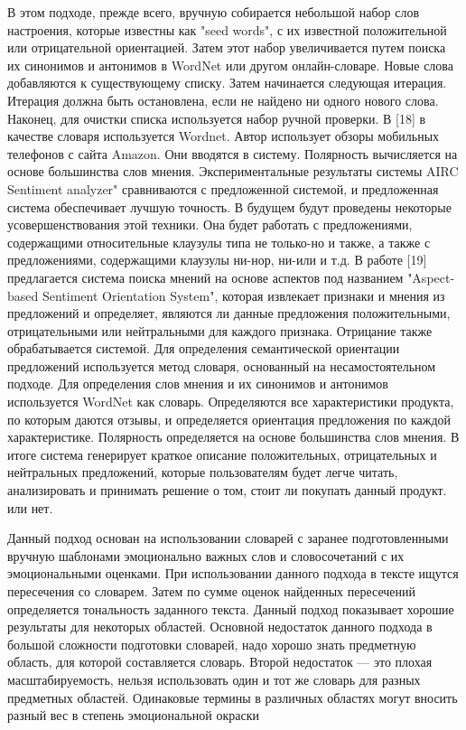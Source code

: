 В этом подходе, прежде всего, вручную собирается небольшой набор слов
настроения, которые известны как "seed words", с их известной положительной или
отрицательной ориентацией. Затем этот набор увеличивается путем поиска их
синонимов и антонимов в WordNet или другом онлайн-словаре. Новые слова
добавляются к существующему списку. Затем начинается следующая итерация.
Итерация должна быть остановлена, если не найдено ни одного нового слова.
Наконец, для очистки списка используется набор ручной проверки. В [18] в
качестве словаря используется Wordnet. Автор использует обзоры мобильных
телефонов с сайта Amazon. Они вводятся в систему. Полярность вычисляется на
основе большинства слов мнения. Экспериментальные результаты системы AIRC
Sentiment analyzer" сравниваются с предложенной системой, и предложенная система
обеспечивает лучшую точность. В будущем будут проведены некоторые
усовершенствования этой техники. Она будет работать с предложениями, содержащими
относительные клаузулы типа не только-но и также, а также с предложениями,
содержащими клаузулы ни-нор, ни-или и т.д.  В работе [19] предлагается система
поиска мнений на основе аспектов под названием "Aspect-based Sentiment
Orientation System", которая извлекает признаки и мнения из предложений и
определяет, являются ли данные предложения положительными, отрицательными или
нейтральными для каждого признака. Отрицание также обрабатывается системой. Для
определения семантической ориентации предложений используется метод словаря,
основанный на несамостоятельном подходе. Для определения слов мнения и их
синонимов и антонимов используется WordNet как словарь. Определяются все
характеристики продукта, по которым даются отзывы, и определяется ориентация
предложения по каждой характеристике. Полярность определяется на основе
большинства слов мнения. В итоге система генерирует краткое описание
положительных, отрицательных и нейтральных предложений, которые пользователям
будет легче читать, анализировать и принимать решение о том, стоит ли покупать
данный продукт. или нет. \cite{article4}

Данный подход основан на использовании словарей с заранее подготовленными
вручную шаблонами эмоционально важных слов и словосочетаний с их эмоциональными
оценками. При использовании данного подхода в тексте ищутся пересечения со
словарем. Затем по сумме оценок найденных пересечений определяется тональность
заданного текста. Данный подход показывает хорошие результаты для некоторых
областей. Основной недостаток данного подхода в большой сложности подготовки
словарей, надо хорошо знать предметную область, для которой составляется
словарь. Второй недостаток — это плохая масштабируемость, нельзя использовать
один и тот же словарь для разных предметных областей. Одинаковые термины в
различных областях могут вносить разный вес в степень эмоциональной окраски
\cite{article9}

